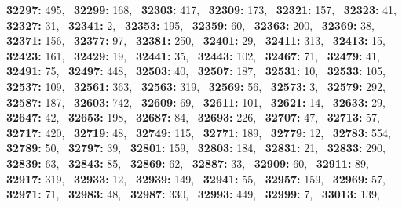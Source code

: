 \textbf{32297:} 495,\allowbreak~ 
\textbf{32299:} 168,\allowbreak~ 
\textbf{32303:} 417,\allowbreak~ 
\textbf{32309:} 173,\allowbreak~ 
\textbf{32321:} 157,\allowbreak~ 
\textbf{32323:} 41,\allowbreak~ 
\textbf{32327:} 31,\allowbreak~ 
\textbf{32341:} 2,\allowbreak~ 
\textbf{32353:} 195,\allowbreak~ 
\textbf{32359:} 60,\allowbreak~ 
\textbf{32363:} 200,\allowbreak~ 
\textbf{32369:} 38,\allowbreak~ 
\textbf{32371:} 156,\allowbreak~ 
\textbf{32377:} 97,\allowbreak~ 
\textbf{32381:} 250,\allowbreak~ 
\textbf{32401:} 29,\allowbreak~ 
\textbf{32411:} 313,\allowbreak~ 
\textbf{32413:} 15,\allowbreak~ 
\textbf{32423:} 161,\allowbreak~ 
\textbf{32429:} 19,\allowbreak~ 
\textbf{32441:} 35,\allowbreak~ 
\textbf{32443:} 102,\allowbreak~ 
\textbf{32467:} 71,\allowbreak~ 
\textbf{32479:} 41,\allowbreak~ 
\textbf{32491:} 75,\allowbreak~ 
\textbf{32497:} 448,\allowbreak~ 
\textbf{32503:} 40,\allowbreak~ 
\textbf{32507:} 187,\allowbreak~ 
\textbf{32531:} 10,\allowbreak~ 
\textbf{32533:} 105,\allowbreak~ 
\textbf{32537:} 109,\allowbreak~ 
\textbf{32561:} 363,\allowbreak~ 
\textbf{32563:} 319,\allowbreak~ 
\textbf{32569:} 56,\allowbreak~ 
\textbf{32573:} 3,\allowbreak~ 
\textbf{32579:} 292,\allowbreak~ 
\textbf{32587:} 187,\allowbreak~ 
\textbf{32603:} 742,\allowbreak~ 
\textbf{32609:} 69,\allowbreak~ 
\textbf{32611:} 101,\allowbreak~ 
\textbf{32621:} 14,\allowbreak~ 
\textbf{32633:} 29,\allowbreak~ 
\textbf{32647:} 42,\allowbreak~ 
\textbf{32653:} 198,\allowbreak~ 
\textbf{32687:} 84,\allowbreak~ 
\textbf{32693:} 226,\allowbreak~ 
\textbf{32707:} 47,\allowbreak~ 
\textbf{32713:} 57,\allowbreak~ 
\textbf{32717:} 420,\allowbreak~ 
\textbf{32719:} 48,\allowbreak~ 
\textbf{32749:} 115,\allowbreak~ 
\textbf{32771:} 189,\allowbreak~ 
\textbf{32779:} 12,\allowbreak~ 
\textbf{32783:} 554,\allowbreak~ 
\textbf{32789:} 50,\allowbreak~ 
\textbf{32797:} 39,\allowbreak~ 
\textbf{32801:} 159,\allowbreak~ 
\textbf{32803:} 184,\allowbreak~ 
\textbf{32831:} 21,\allowbreak~ 
\textbf{32833:} 290,\allowbreak~ 
\textbf{32839:} 63,\allowbreak~ 
\textbf{32843:} 85,\allowbreak~ 
\textbf{32869:} 62,\allowbreak~ 
\textbf{32887:} 33,\allowbreak~ 
\textbf{32909:} 60,\allowbreak~ 
\textbf{32911:} 89,\allowbreak~ 
\textbf{32917:} 319,\allowbreak~ 
\textbf{32933:} 12,\allowbreak~ 
\textbf{32939:} 149,\allowbreak~ 
\textbf{32941:} 55,\allowbreak~ 
\textbf{32957:} 159,\allowbreak~ 
\textbf{32969:} 57,\allowbreak~ 
\textbf{32971:} 71,\allowbreak~ 
\textbf{32983:} 48,\allowbreak~ 
\textbf{32987:} 330,\allowbreak~ 
\textbf{32993:} 449,\allowbreak~ 
\textbf{32999:} 7,\allowbreak~ 
\textbf{33013:} 139,\allowbreak~ 
